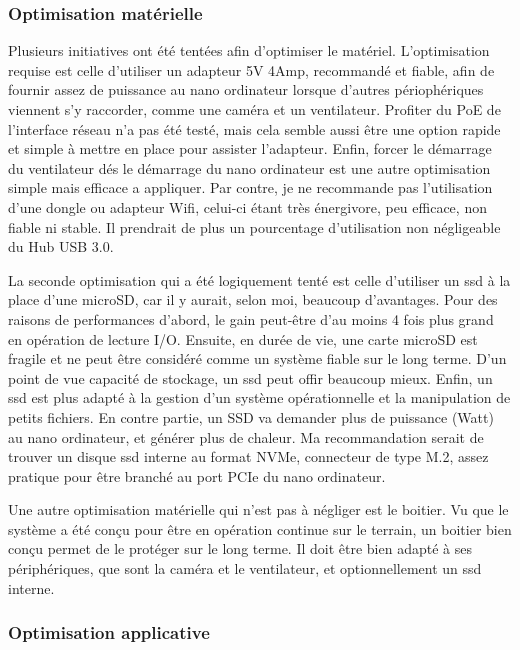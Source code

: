 \subsubsection{Optimisation matérielle}
\par Plusieurs initiatives ont été tentées afin d'optimiser le matériel. L'optimisation requise est celle d'utiliser un adapteur 5V 4Amp, recommandé et fiable, afin de fournir assez de puissance au nano ordinateur lorsque d'autres périophériques viennent s'y raccorder, comme une caméra et un ventilateur. Profiter du PoE de l'interface réseau n'a pas été testé, mais cela semble aussi être une option rapide et simple à mettre en place pour assister l'adapteur. Enfin, forcer le démarrage du ventilateur dés le démarrage du nano ordinateur est une autre optimisation simple mais efficace a appliquer. Par contre, je ne recommande pas l'utilisation d'une dongle ou adapteur Wifi, celui-ci étant très énergivore, peu efficace, non fiable ni stable. Il prendrait de plus un pourcentage d'utilisation non négligeable du Hub USB 3.0. 
\par La seconde optimisation qui a été logiquement tenté est celle d'utiliser un \acrshort{ssd} à la place d'une microSD, car il y aurait, selon moi, beaucoup d'avantages. Pour des raisons de performances d'abord, le gain peut-être d'au moins 4 fois plus grand en opération de lecture I/O. Ensuite, en durée de vie, une carte microSD est fragile et ne peut être considéré comme un système fiable sur le long terme. D'un point de vue capacité de stockage, un \acrshort{ssd} peut offir beaucoup mieux. Enfin, un \acrshort{ssd} est plus adapté à la gestion d'un système opérationnelle et la manipulation de petits fichiers. En contre partie, un SSD va demander plus de puissance (Watt) au nano ordinateur, et générer plus de chaleur. Ma recommandation serait de trouver un disque \acrshort{ssd} interne au format NVMe, connecteur de type M.2, assez pratique pour être branché au port PCIe du nano ordinateur.
\par Une autre optimisation matérielle qui n'est pas à négliger est le boitier. Vu que le système a été conçu pour être en opération continue sur le terrain, un boitier bien conçu permet de le protéger sur le long terme. Il doit être bien adapté à ses périphériques, que sont la caméra et le ventilateur, et optionnellement un \acrshort{ssd} interne.
\subsubsection{Optimisation applicative}
